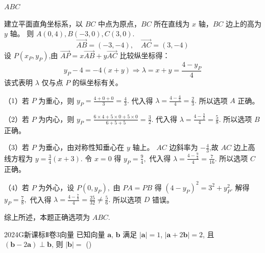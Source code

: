 \documentclass[12pt,UTF-8,a4paper]{ctexart}
\numberwithin{figure}{section}
\theoremstyle{mystyle}
\theoremstyle{mystylekaishu}
\theoremstyle{mystyle}
\numberwithin{xiti}{section}
\begin{document}
\begin{answer}
$ABC$
\end{answer}

\begin{solutions}
建立平面直角坐标系，以 $BC$ 中点为原点，$BC$ 所在直线为 $x$ 轴，$BC$ 边上的高为 $y$ 轴。
则 $A(0,4), B(-3,0), C(3,0)$.
$$
\overrightarrow{AB}=(-3,-4), \quad \overrightarrow{AC}=(3,-4)
$$
设 $P(x_P,y_P)$,由 $\overrightarrow{AP}=x \overrightarrow{AB}+y \overrightarrow{AC}$ 比较纵坐标得：
$$
y_P-4=-4(x+y) \Rightarrow \lambda=x+y=\frac{4-y_P}{4}
$$
该式表明 $\lambda$ 仅与点 $P$ 的纵坐标有关。

（$1$）若 $P$ 为重心，则 $y_P=\displaystyle\frac{4+0+0}{3}=\displaystyle\frac{4}{3}.$
代入得 $\lambda=\displaystyle\frac{4-\frac{4}{3}}{4}=\displaystyle\frac{2}{3}.$ 所以选项 $A$ 正确。

（$2$）若 $P$ 为内心，则 $y_P=\displaystyle\frac{6\times 4+5\times 0+5\times 0}{6+5+5}=\displaystyle\frac{3}{2}.$
代入得 $\lambda=\displaystyle\frac{4-\frac{3}{2}}{4}=\displaystyle\frac{5}{8}.$ 所以选项 $B$ 正确。

（$3$）若 $P$ 为垂心，由对称性知垂心在 $y$ 轴上。
$AC$ 边斜率为 $-\displaystyle\frac{4}{3}$,故 $AC$ 边上高线方程为 $y=\displaystyle\frac{3}{4}(x+3).$
令 $x=0$ 得 $y_P=\displaystyle\frac{9}{4},$ 代入得 $\lambda=\displaystyle\frac{4-\frac{9}{4}}{4}=\displaystyle\frac{7}{16}.$ 所以选项 $C$ 正确。

（$4$）若 $P$ 为外心，设 $P(0,y_P),$ 由 $PA=PB$ 得 $(4-y_P)^2=3^2+y_P^2.$
解得 $y_P=\displaystyle\frac{7}{8},$ 代入得 $\lambda=\displaystyle\frac{4-\frac{7}{8}}{4}=\displaystyle\frac{25}{32}\neq\displaystyle\frac{5}{6}.$ 所以选项 $D$ 错误。

综上所述，本题正确选项为 $ABC.$ 
\end{solutions}


\begin{problem}{2024}{G}{新课标Ⅱ卷}{3}{向量}
已知向量 $\boldsymbol{a}$, $\boldsymbol{b}$ 满足 $|\boldsymbol{a}|=1$, $|\boldsymbol{a}+2\boldsymbol{b}|=2$, 且 $(\boldsymbol{b}-2\boldsymbol{a}) \perp \boldsymbol{b}$, 则 $|\boldsymbol{b}|=$ (\hspace{1cm})
\begin{choices}
\end{choices}
\end{problem}
\end{document}
